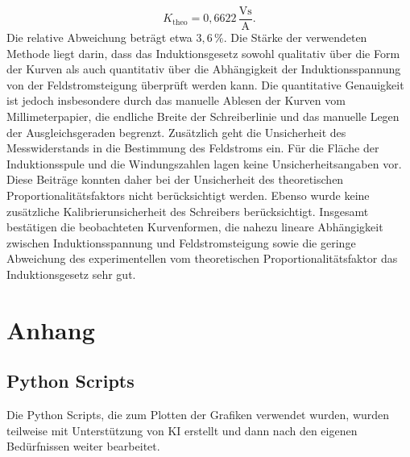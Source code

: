 \documentclass{report}
\begin{document}
\begin{equation}
K_{\mathrm{theo}}
=
0{,}6622\,\mathrm{\frac{Vs}{A}}.
\end{equation}
\noindent
Die relative Abweichung beträgt etwa $3{,}6\,\%$.
\noindent
Die Stärke der verwendeten Methode liegt darin, dass das Induktionsgesetz sowohl
qualitativ über die Form der Kurven als auch quantitativ über die Abhängigkeit der
Induktionsspannung von der Feldstromsteigung überprüft werden kann. Die
quantitative Genauigkeit ist jedoch insbesondere durch das manuelle Ablesen der
Kurven vom Millimeterpapier, die endliche Breite der Schreiberlinie und das
manuelle Legen der Ausgleichsgeraden begrenzt. Zusätzlich geht die Unsicherheit
des Messwiderstands in die Bestimmung des Feldstroms ein.
\noindent
Für die Fläche der Induktionsspule und die Windungszahlen lagen keine
Unsicherheitsangaben vor. Diese Beiträge konnten daher bei der Unsicherheit des
theoretischen Proportionalitätsfaktors nicht berücksichtigt werden. Ebenso wurde
keine zusätzliche Kalibrierunsicherheit des Schreibers berücksichtigt.
\noindent
Insgesamt bestätigen die beobachteten Kurvenformen, die nahezu lineare
Abhängigkeit zwischen Induktionsspannung und Feldstromsteigung sowie die geringe
Abweichung des experimentellen vom theoretischen Proportionalitätsfaktor das
Induktionsgesetz sehr gut.







\newpage
\chapter{Anhang}
\section{Python Scripts}
Die Python Scripts, die zum Plotten der Grafiken verwendet wurden, wurden teilweise mit Unterstützung von KI erstellt und dann nach den eigenen Bedürfnissen weiter
bearbeitet.

\end{document}
